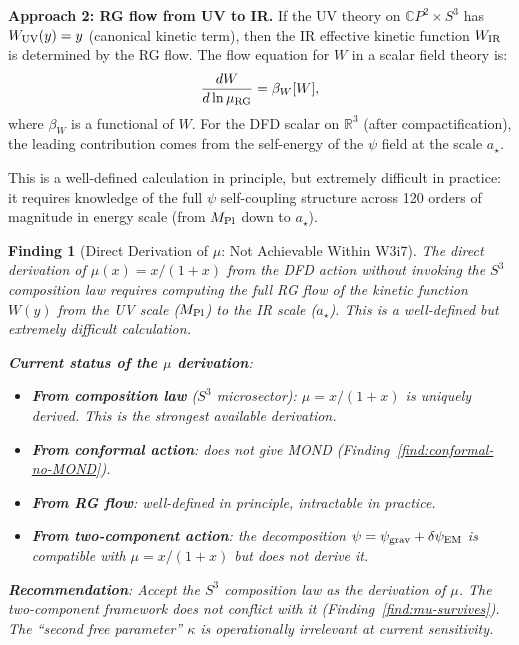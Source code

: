 \documentclass[11pt]{article}
\newtheorem{finding}{Finding}
\newcommand{\psigrav}{\psi_{\rm grav}}
\newcommand{\dpsiEM}{\delta\psi_{\rm EM}}
\newcommand{\mufd}{\mu}
\newcommand{\CP}{\mathbb{C}P}
\begin{document}
\textbf{Approach 2: RG flow from UV to IR.}
If the UV theory on $\CP^2 \times S^3$ has $W_{\rm UV}(y) = y$
(canonical kinetic term), then the IR effective kinetic function $W_{\rm IR}$
is determined by the RG flow. The flow equation for $W$ in a scalar
field theory is:
\begin{equation}
\frac{dW}{d\ln\mu_{\rm RG}} = \beta_W[W],
\end{equation}
where $\beta_W$ is a functional of $W$. For the DFD scalar on
$\mathbb{R}^3$ (after compactification), the leading contribution
comes from the self-energy of the $\psi$ field at the scale $a_\star$.

This is a well-defined calculation in principle, but extremely
difficult in practice: it requires knowledge of the full $\psi$
self-coupling structure across 120 orders of magnitude in energy scale
(from $M_{\rm Pl}$ down to $a_\star$).

\begin{finding}[Direct Derivation of $\mufd$: Not Achievable Within W3i7]
\label{find:mu-not-derived}
The direct derivation of $\mufd(x) = x/(1+x)$ from the DFD action
without invoking the $S^3$ composition law requires computing the
full RG flow of the kinetic function $W(y)$ from the UV scale ($M_{\rm Pl}$)
to the IR scale ($a_\star$). This is a well-defined but extremely
difficult calculation.

\textbf{Current status of the $\mufd$ derivation}:
\begin{itemize}[nosep]
\item \textbf{From composition law} ($S^3$ microsector): $\mufd = x/(1+x)$
  is uniquely derived. This is the strongest available derivation.
\item \textbf{From conformal action}: does not give MOND
  (Finding~\ref{find:conformal-no-MOND}).
\item \textbf{From RG flow}: well-defined in principle, intractable
  in practice.
\item \textbf{From two-component action}: the decomposition
  $\psi = \psigrav + \dpsiEM$ is compatible with $\mufd = x/(1+x)$
  but does not derive it.
\end{itemize}

\textbf{Recommendation}: Accept the $S^3$ composition law as the
derivation of $\mufd$. The two-component framework does not conflict
with it (Finding~\ref{find:mu-survives}). The ``second free parameter''
$\kappa$ is operationally irrelevant at current sensitivity.
\end{finding}
\end{document}
